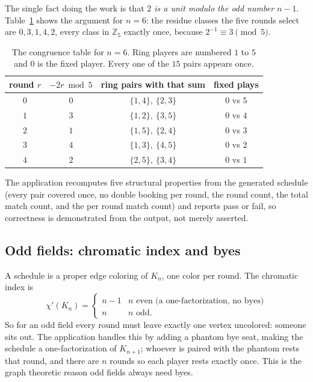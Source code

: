 \documentclass[11pt]{article}
\begin{document}
The single fact doing the work is that \emph{$2$ is a unit modulo the odd number
$n-1$}. Table~\ref{tab:cong} shows the argument for $n=6$: the residue classes the
five rounds select are $0,3,1,4,2$, every class in $\mathbb{Z}_5$ exactly once,
because $2^{-1} \equiv 3 \pmod 5$.

\begin{table}[h]
\centering
\begin{tabular}{cccc}
\toprule
round $r$ & $-2r \bmod 5$ & ring pairs with that sum & fixed plays \\
\midrule
$0$ & $0$ & $\{1,4\},\ \{2,3\}$ & $0$ vs $5$ \\
$1$ & $3$ & $\{1,2\},\ \{3,5\}$ & $0$ vs $4$ \\
$2$ & $1$ & $\{1,5\},\ \{2,4\}$ & $0$ vs $3$ \\
$3$ & $4$ & $\{1,3\},\ \{4,5\}$ & $0$ vs $2$ \\
$4$ & $2$ & $\{2,5\},\ \{3,4\}$ & $0$ vs $1$ \\
\bottomrule
\end{tabular}
\caption{The congruence table for $n=6$. Ring players are numbered $1$ to $5$ and
$0$ is the fixed player. Every one of the $15$ pairs appears once.}
\label{tab:cong}
\end{table}

The application recomputes five structural properties from the generated schedule
(every pair covered once, no double booking per round, the round count, the total
match count, and the per round match count) and reports pass or fail, so
correctness is demonstrated from the output, not merely asserted.

\subsection{Odd fields: chromatic index and byes}

A schedule is a proper edge coloring of $K_n$, one color per round. The chromatic
index is
\[
\chi'(K_n) = \begin{cases} n-1 & n \text{ even (a one-factorization, no byes)}\\ n & n \text{ odd.}\end{cases}
\]
So for an odd field every round must leave exactly one vertex uncolored: someone
sits out. The application handles this by adding a phantom bye seat, making the
schedule a one-factorization of $K_{n+1}$; whoever is paired with the phantom rests
that round, and there are $n$ rounds so each player rests exactly once. This is the
graph theoretic reason odd fields always need byes.
\end{document}
